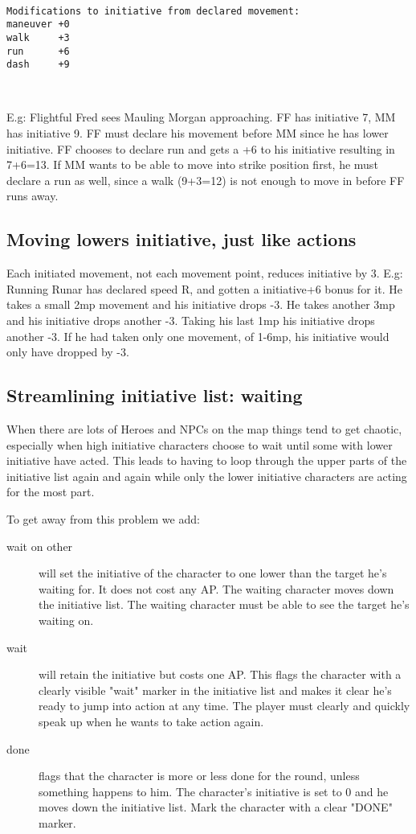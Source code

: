 \

\begin{verbatim}
Modifications to initiative from declared movement:
maneuver +0
walk     +3
run      +6
dash     +9
\end{verbatim}

\

E.g: Flightful Fred sees Mauling Morgan approaching. FF has initiative 7, MM has initiative 9. FF must declare his movement before MM since he has lower initiative. FF chooses to declare run and gets a +6 to his initiative resulting in 7+6=13. If MM wants to be able to move into strike position first, he must declare a run as well, since a walk (9+3=12) is not enough to move in before FF runs away.


\subsection*{Moving lowers initiative, just like actions}
\label{sec:movinglowersinitiative}
Each initiated movement, not each movement point, reduces initiative by 3. E.g: Running Runar has declared speed R, and gotten a initiative+6 bonus for it. He takes a small 2mp movement and his initiative drops -3. He takes another 3mp and his initiative drops another -3. Taking his last 1mp his initiative drops another -3. If he had taken only one movement, of 1-6mp, his initiative would only have dropped by -3.


\subsection*{Streamlining initiative list: waiting}
When there are lots of Heroes and NPCs on the map things tend to get chaotic, especially when high initiative characters choose to wait until some with lower initiative have acted. This leads to having to loop through the upper parts of the initiative list again and again while only the lower initiative characters are acting for the most part.

To get away from this problem we add:
\begin{description}
\item[wait on other] will set the initiative of the character to one lower than the target he's waiting for. It does not cost any AP. The waiting character moves down the initiative list. The waiting character must be able to see the target he's waiting on.
\item[wait] will retain the initiative but costs one AP. This flags the character with a clearly visible "wait" marker in the initiative list and makes it clear he's ready to jump into action at any time. The player must clearly and quickly speak up when he wants to take action again.
\item[done] flags that the character is more or less done for the round, unless something happens to him. The character's initiative is set to 0 and he moves down the initiative list. Mark the character with a clear "DONE" marker.
\end{description}

